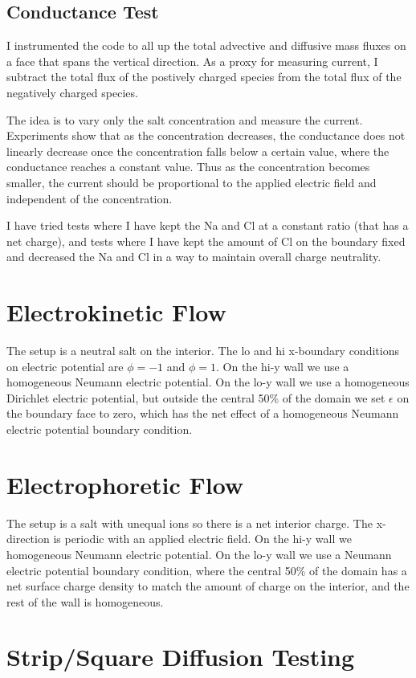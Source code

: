 \documentclass[final]{siamltex}
\begin{document}
\subsection{Conductance Test}
I instrumented the code to all up the total advective and diffusive mass fluxes on a face
that spans the vertical direction.  As a proxy for measuring current, I subtract
the total flux of the postively charged species from the total flux of the negatively
charged species.

The idea is to vary only the salt concentration and measure the current.  Experiments
show that as the concentration decreases, the conductance does not linearly decrease once
the concentration falls below a certain value, where the conductance reaches
a constant value.  Thus as the concentration becomes smaller, the current should be
proportional to the applied electric field and independent of the concentration.

I have tried tests where I have kept the Na and Cl at a constant ratio (that has
a net charge), and tests where I have kept the amount of Cl on the boundary
fixed and decreased the Na and Cl in a way to maintain overall charge neutrality.

\section{Electrokinetic Flow}
The setup is a neutral salt on the interior.
The lo and hi x-boundary conditions on electric potential
are $\phi=-1$ and $\phi=1$.
On the hi-y wall we use a homogeneous Neumann electric potential.
On the lo-y wall we use a homogeneous Dirichlet electric potential,
but outside the central 50\% of the domain we set $\epsilon$ on the
boundary face to zero, which has the net effect of a homogeneous
Neumann electric potential boundary condition.

\section{Electrophoretic Flow}
The setup is a salt with unequal ions so there is a net interior charge.
The x-direction is periodic with an applied electric field.
On the hi-y wall we homogeneous Neumann electric potential.
On the lo-y wall we use a Neumann electric potential boundary condition, where the
central 50\% of the domain has a net surface charge density to match
the amount of charge on the interior, and the rest of the wall is homogeneous.

\section{Strip/Square Diffusion Testing}
\end{document}
